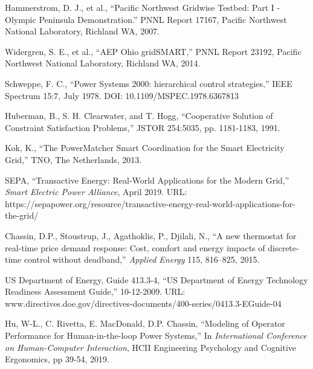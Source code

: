 \begin{thebibliography}{9}

 Hammerstrom, D. J., et al., ``Pacific Northwest Gridwise Testbed: Part I - Olympic Peninsula Demonstration.'' PNNL Report 17167, Pacific Northwest National Laboratory, Richland WA, 2007. 

 Widergren, S. E., et al., ``AEP Ohio gridSMART,'' PNNL Report 23192, Pacific Northwest National Laboratory, Richland WA, 2014. 

 Schweppe, F. C., ``Power Systems 2000: hierarchical control strategies,'' IEEE Spectrum 15:7, July 1978. DOI: 10.1109/MSPEC.1978.6367813

 Huberman, B., S. H. Clearwater, and T. Hogg, ``Cooperative Solution of Constraint Satisfaction Problems,'' JSTOR 254:5035, pp. 1181-1183, 1991. 

 Kok, K., ``The PowerMatcher Smart Coordination for the Smart Electricity Grid,'' TNO, The Netherlands, 2013.

 SEPA, ``Transactive Energy: Real-World Applications for the Modern Grid,'' \textit{Smart Electric Power Alliance}, April 2019. URL:  https://sepapower.org/resource/transactive-energy-real-world-applications-for-the-grid/

 Chassin, D.P., Stoustrup, J., Agathoklis, P., Djilali, N.,  ``A new thermostat for real-time price demand response: Cost, comfort and energy impacts of discrete-time control without deadband,'' \textit{Applied Energy} 115, 816--825, 2015.

 US Department of Energy, Guide 413.3-4, ``US Department of Energy Technology Readiness Assessment Guide,'' 10-12-2009. URL: www.directives.doe.gov/directives-documents/400-series/0413.3-EGuide-04

 Hu, W-L., C. Rivetta, E. MacDonald, D.P. Chassin, ``Modeling of Operator Performance for Human-in-the-loop Power Systems,'' In \textit{International Conference on Human-Computer Interaction}, HCII Engineering Psychology and Cognitive Ergonomics, pp 39-54, 2019.

\end{thebibliography}

